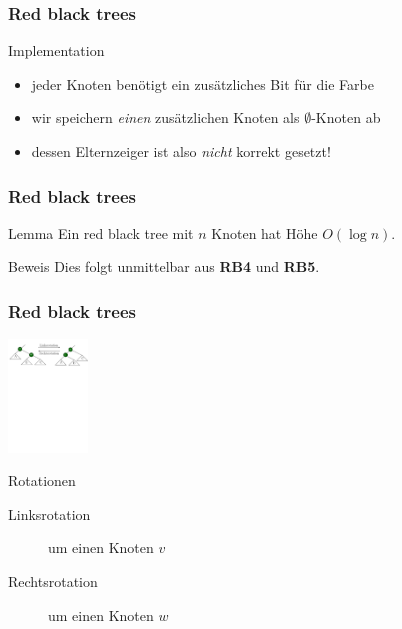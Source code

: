 \documentclass[aspectratio=1610, 11pt]{beamer}
\newcommand{\mytitle}{Red black trees}
\begin{document}
\begin{frame}\frametitle{\mytitle}
	\begin{exampleblock}{Implementation}
		\begin{itemize}
			\item jeder Knoten ben\"otigt ein zus\"atzliches Bit f\"ur die Farbe
			\item wir speichern \emph{einen} zus\"atzlichen Knoten als $\emptyset$-Knoten ab
			\item dessen Elternzeiger ist also \emph{nicht} korrekt gesetzt!
		\end{itemize}
	\end{exampleblock}
\end{frame}

\begin{frame}\frametitle{\mytitle}
	\begin{block}{Lemma}
		Ein red black tree mit $n$ Knoten hat H\"ohe $O(\log n)$.
	\end{block}
	\begin{exampleblock}{Beweis}
		Dies folgt unmittelbar aus {\bf RB4} und {\bf RB5}.
	\end{exampleblock}
\end{frame}

\begin{frame}\frametitle{\mytitle}
	\hfill\includegraphics[height=30mm]{./images/rotate1.pdf}
	\begin{exampleblock}{Rotationen}
		\begin{description}
			\item[Linksrotation] um einen Knoten $v$
			\item[Rechtsrotation] um einen Knoten $w$
		\end{description}
	\end{exampleblock}
\end{frame}
\end{document}
